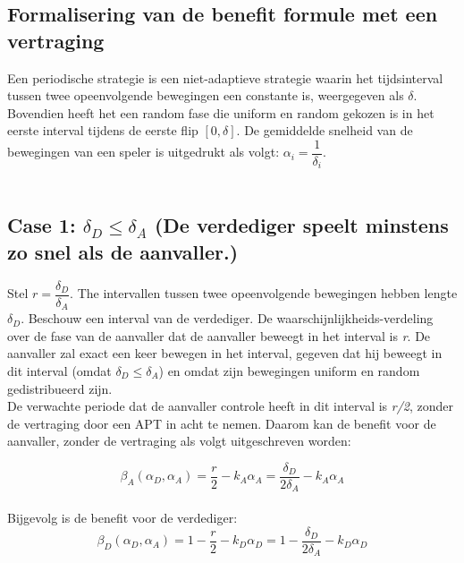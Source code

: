 \documentclass[master=cws, masteroption=vs,english]{kulemt}
\begin{document}
\begin{abstract*}
\subsection{ Formalisering van de benefit formule met een vertraging}
Een periodische strategie is een niet-adaptieve strategie waarin het tijdsinterval tussen twee opeenvolgende bewegingen een constante is, weergegeven als $\delta$. Bovendien heeft het een random fase die uniform en random gekozen is in het eerste interval tijdens de eerste flip $[0,\delta]$. De gemiddelde snelheid van de bewegingen van een speler is uitgedrukt als volgt: $\alpha_{i} = \dfrac{1}{\delta_{i}}$. \\
~~\\

\subsection*{\textbf{Case 1:} $\delta_{D} \leq \delta_{A} $ (De verdediger speelt minstens zo snel als de aanvaller.) }

Stel $r = \dfrac{\delta_{D}}{ \delta_{A} }$. The intervallen tussen twee opeenvolgende bewegingen hebben lengte $\delta_{D}$. Beschouw een interval van de verdediger. De waarschijnlijkheids-verdeling over de fase van de aanvaller dat de aanvaller beweegt in het interval is \textit{r}. De aanvaller zal exact een keer bewegen in het interval, gegeven dat hij beweegt in dit interval (omdat $\delta_{D} \leq \delta_{A} $) en omdat zijn bewegingen uniform en random gedistribueerd zijn. \\

De verwachte periode dat de aanvaller controle heeft in dit interval is \textit{r/2}, zonder de vertraging door een APT in acht te nemen. Daarom kan de benefit voor de aanvaller, zonder de vertraging als volgt uitgeschreven worden:

\begin{equation}\label{first}
\beta_{A}(\alpha_{D},\alpha_{A}) =\dfrac {r} {2} - k_{A} \alpha_{A} = \dfrac {\delta_{D}} {2\delta_{A}} - k_{A} \alpha_{A}  
\end{equation}\\

Bijgevolg is de benefit voor de verdediger:
\begin{equation}\label{first}
\beta_{D}(\alpha_{D},\alpha_{A}) =1 -  \dfrac {r} {2} - k_{D} \alpha_{D} = 1 - \dfrac {\delta_{D}} {2\delta_{A}} - k_{D} \alpha_{D} 
\end{equation}


\end{abstract*}
\end{document}
